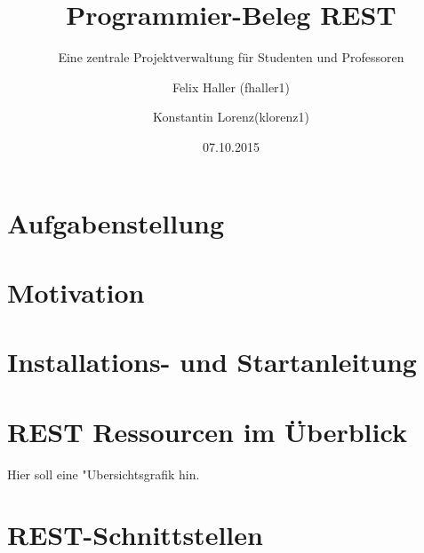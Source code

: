 \documentclass[12pt]{scrartcl}
\begin{document}
	
	
	\subject{Verteilte Systeme}
	\title{Programmier-Beleg REST}
	\subtitle{Eine zentrale Projektverwaltung für Studenten und Professoren}
	\author{Felix Haller (fhaller1) \and Konstantin Lorenz(klorenz1)}
	\date{07.10.2015}
	\publishers{Prüfer: Prof. Dr.-Ing. Andreas Ittner}
	\maketitle
	
	\newpage
	\tableofcontents
	\newpage	
	
	
	
	
	\section{Aufgabenstellung}
	\section{Motivation}
	\section{Installations- und Startanleitung}
	\section{REST Ressourcen im Überblick}
		Hier soll eine "Ubersichtsgrafik hin.
	\section{REST-Schnittstellen}
\end{document}
